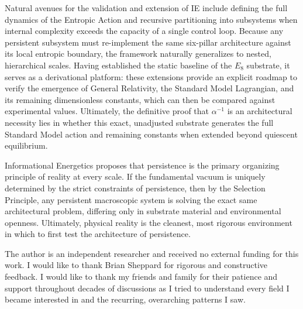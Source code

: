 Natural avenues for the validation and extension of IE include defining the full dynamics of the Entropic Action and recursive partitioning into subsystems when internal complexity exceeds the capacity of a single control loop. Because any persistent subsystem must re-implement the same six-pillar architecture against its local entropic boundary, the framework naturally generalizes to nested, hierarchical scales. Having established the static baseline of the $E_8$ substrate, it serves as a derivational platform: these extensions provide an explicit roadmap to verify the emergence of General Relativity, the Standard Model Lagrangian, and its remaining dimensionless constants, which can then be compared against experimental values. Ultimately, the definitive proof that $\alpha^{-1}$ is an architectural necessity lies in whether this exact, unadjusted substrate generates the full Standard Model action and remaining constants when extended beyond quiescent equilibrium.

Informational Energetics proposes that persistence is the primary organizing principle of reality at every scale. If the fundamental vacuum is uniquely determined by the strict constraints of persistence, then by the Selection Principle, any persistent macroscopic system is solving the exact same architectural problem, differing only in substrate material and environmental openness. Ultimately, physical reality is the cleanest, most rigorous environment in which to first test the architecture of persistence.

\begin{acknowledgments}
The author is an independent researcher and received no external funding for this work. I would like to thank Brian Sheppard for rigorous and constructive feedback. I would like to thank my friends and family for their patience and support throughout decades of discussions as I tried to understand every field I became interested in and the recurring, overarching patterns I saw.
\end{acknowledgments}